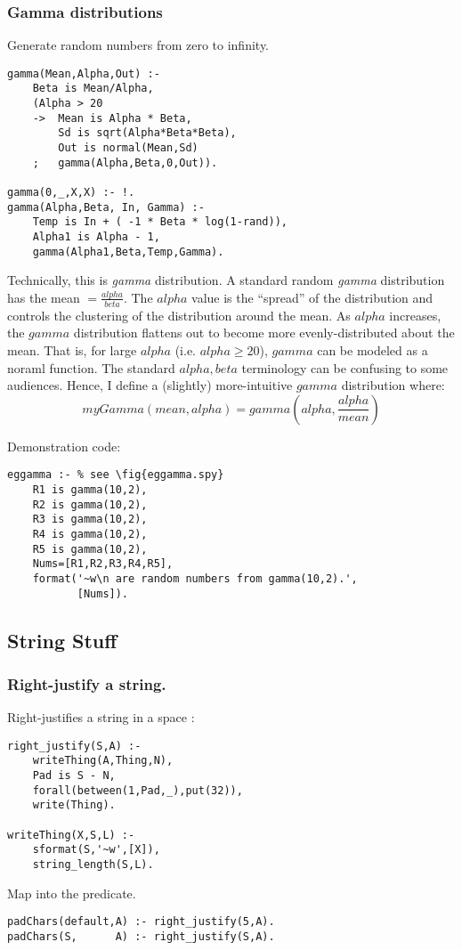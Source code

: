 \subsubsection{ Gamma distributions
}
\label{sec:gammas} 
Generate random numbers from zero to infinity.
\begin{Verbatim}
gamma(Mean,Alpha,Out) :-
    Beta is Mean/Alpha,
    (Alpha > 20
    ->  Mean is Alpha * Beta,
        Sd is sqrt(Alpha*Beta*Beta),
        Out is normal(Mean,Sd)
    ;   gamma(Alpha,Beta,0,Out)).

gamma(0,_,X,X) :- !.
gamma(Alpha,Beta, In, Gamma) :-
    Temp is In + ( -1 * Beta * log(1-rand)),
    Alpha1 is Alpha - 1,
    gamma(Alpha1,Beta,Temp,Gamma).
\end{Verbatim}
 Technically, this is {\em gamma} distribution.
A standard random {\em gamma} distribution has the mean
$=\frac{alpha}{beta}$.
The $alpha$ value is the ``spread'' of the 
distribution and controls the
clustering of  the distribution
around the mean. As
$alpha$ increases,
the $gamma$ distribution flattens out to become 
more evenly-distributed about the mean. That is, for large
$alpha$ (i.e. $alpha\ge20$), $gamma$ can be modeled as a noraml
function.
The standard $alpha,beta$ terminology can be confusing
to some audiences. Hence, I define a
(slightly) more-intuitive $gamma$
distribution where:
\[
myGamma(mean,alpha)=gamma\left(alpha,\frac{alpha}{mean}\right)
\]

Demonstration code:
\begin{Verbatim}
eggamma :- % see \fig{eggamma.spy}
    R1 is gamma(10,2),
    R2 is gamma(10,2),
    R3 is gamma(10,2),
    R4 is gamma(10,2),
    R5 is gamma(10,2),
    Nums=[R1,R2,R3,R4,R5],
    format('~w\n are random numbers from gamma(10,2).',
           [Nums]).
\end{Verbatim} 
\subsection{ String Stuff
}
\label{sec:strings}
\subsubsection{ Right-justify a string.
}
Right-justifies a string  in a space 
: 
\begin{Verbatim}
right_justify(S,A) :-
    writeThing(A,Thing,N),
    Pad is S - N,
    forall(between(1,Pad,_),put(32)),
    write(Thing).

writeThing(X,S,L) :- 
    sformat(S,'~w',[X]), 
    string_length(S,L).
\end{Verbatim}
Map  into the 
predicate.
\begin{Verbatim}
padChars(default,A) :- right_justify(5,A).
padChars(S,      A) :- right_justify(S,A).   
\end{Verbatim}  
